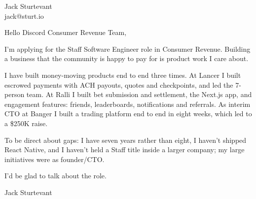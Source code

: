 \documentclass[11pt]{article}
\begin{document}
\raggedright

{\namefont\fontsize{20pt}{24pt}\selectfont Jack Sturtevant}\\[-0.3em]
jack@sturt.io

\vspace{1.2em}

Hello Discord Consumer Revenue Team,

I'm applying for the Staff Software Engineer role in Consumer Revenue. Building a business that the community is happy to pay for is product work I care about.

I have built money-moving products end to end three times. At Lancer I built escrowed payments with ACH payouts, quotes and checkpoints, and led the 7-person team. At Ralli I built bet submission and settlement, the Next.js app, and engagement features: friends, leaderboards, notifications and referrals. As interim CTO at Banger I built a trading platform end to end in eight weeks, which led to a \$250K raise.

To be direct about gaps: I have seven years rather than eight, I haven't shipped React Native, and I haven't held a Staff title inside a larger company; my large initiatives were as founder/CTO.

I'd be glad to talk about the role.

\vspace{0.6em}
Jack Sturtevant
\end{document}
